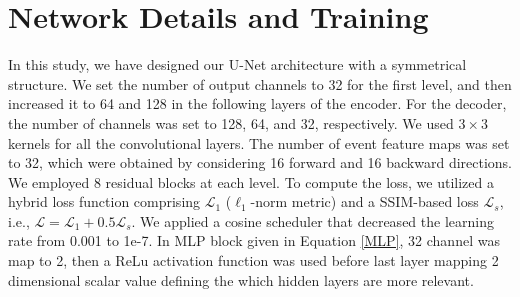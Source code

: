 \documentclass{article}
\begin{document}
\section{Network Details and Training}

In this study, we have designed our U-Net architecture with a symmetrical structure. We set the number of output channels to 32 for the first level, 
and then increased it to 64 and 128 in the following layers of the encoder. For the decoder, the number of channels was set to 128, 64, and 32, respectively.
We used $3 \times 3$ kernels for all the convolutional layers. The number of event feature maps was set to 32, which were obtained by considering 16 
forward and 16 backward directions. We employed 8 residual blocks at each level. To compute the loss, we utilized a hybrid loss 
function comprising  $\mathcal{L}_{1}$ ($\ell_1$-norm metric) and a SSIM-based loss $\mathcal{L}_{s}$, i.e., $\mathcal{L} = \mathcal{L}_{1} +  0.5\mathcal{L}_{s} $. We applied a 
cosine scheduler that decreased the learning rate from 0.001 to 1e-7. In MLP block given in Equation \eqref{MLP}, 32 channel was map to 2, then a ReLu activation function
was used before last layer mapping 2 dimensional scalar value defining the which hidden layers are more relevant. 
\end{document}
